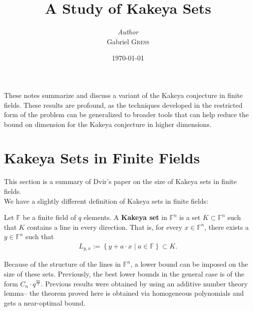 \documentclass{memoir}
\institute{Rice University}
\title{A Study of Kakeya Sets}
\author{\textit{Author}\\Gabriel \textsc{Gress}}
\date{\today}
\begin{document}
\maketitle


These notes summarize and discuss a variant of the Kakeya conjecture in finite fields. These results are profound, as the techniques developed in the restricted form of the problem can be generalized to broader tools that can help reduce the bound on dimension for the Kakeya conjecture in higher dimensions.

\chapter{Kakeya Sets in Finite Fields}
\label{cha:kakeya_sets_in_finite_fields}

This section is a summary of Dvir's paper on the size of Kakeya sets in finite fields.\\

We have a slightly different definition of Kakeya sets in finite fields:
\begin{defn}
	Let \(\mathbb{F}\) be a finite field of \(q\) elements. A \textbf{Kakeya set} in \(\mathbb{F}^{n}\) is a set \(K\subset \mathbb{F}^{n}\) such that \(K\) contains a line in every direction. That is, for every \(x \in \mathbb{F}^{n}\), there exists a \(y \in \mathbb{F}^{n}\) such that
	\begin{align*}
		L_{y,x} := \left\{y + a\cdot x \mid a \in \mathbb{F} \right\} \subset K.
	\end{align*}
\end{defn}


Because of the structure of the lines in \(\mathbb{F}^{n}\), a lower bound can be imposed on the size of these sets. Previously, the best lower bounds in the general case is of the form \(C_n \cdot q^{\frac{4n}{7}}\). Previous results were obtained by using an additive number theory lemma-- the theorem proved here is obtained via homogeneous polynomials and gets a near-optimal bound.
\end{document}
